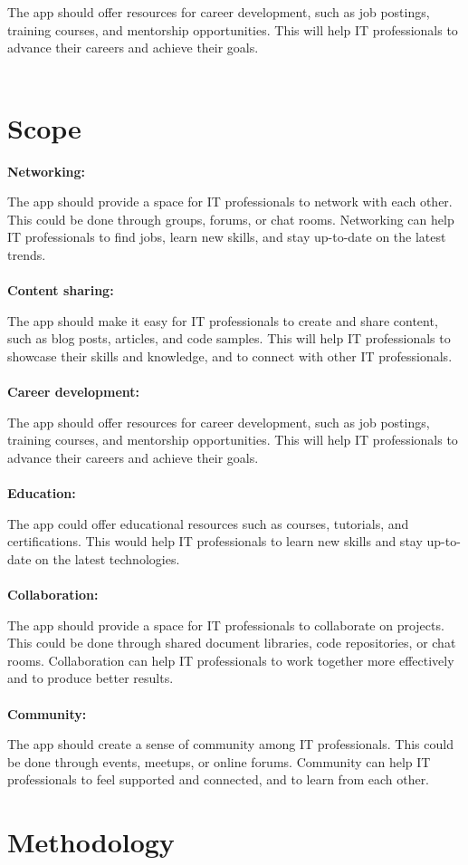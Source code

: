 \documentclass{article}
\begin{document}
The app should offer resources for career development, such as job postings, training courses, and mentorship opportunities. This will help IT professionals to advance their careers and achieve their goals.\\\\


\section{Scope}
\textbf{Networking:}


The app should provide a space for IT professionals to network with each other. This could be done through groups, forums, or chat rooms. Networking can help IT professionals to find jobs, learn new skills, and stay up-to-date on the latest trends.\\\\
\textbf{Content sharing:}


The app should make it easy for IT professionals to create and share content, such as blog posts, articles, and code samples. This will help IT professionals to showcase their skills and knowledge, and to connect with other IT professionals.\\\\
\textbf{Career development:}


The app should offer resources for career development, such as job postings, training courses, and mentorship opportunities. This will help IT professionals to advance their careers and achieve their goals.\\\\
\textbf{Education:}


The app could offer educational resources such as courses, tutorials, and certifications. This would help IT professionals to learn new skills and stay up-to-date on the latest technologies.\\\\
\textbf{Collaboration:}


The app should provide a space for IT professionals to collaborate on projects. This could be done through shared document libraries, code repositories, or chat rooms. Collaboration can help IT professionals to work together more effectively and to produce better results.\\\\
\textbf{Community:}


The app should create a sense of community among IT professionals. This could be done through events, meetups, or online forums. Community can help IT professionals to feel supported and connected, and to learn from each other.\\

\section{Methodology}
\end{document}
